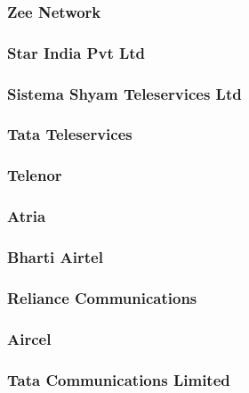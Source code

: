 \documentclass{article}
\begin{document}
\subsubsection{Zee Network}


\subsubsection{Star India Pvt Ltd}


\subsubsection{Sistema Shyam Teleservices Ltd}


\subsubsection{Tata Teleservices}


\subsubsection{Telenor}


\subsubsection{Atria}


\subsubsection{Bharti Airtel}


\subsubsection{Reliance Communications}


\subsubsection{Aircel}


\subsubsection{Tata Communications Limited}

\end{document}
